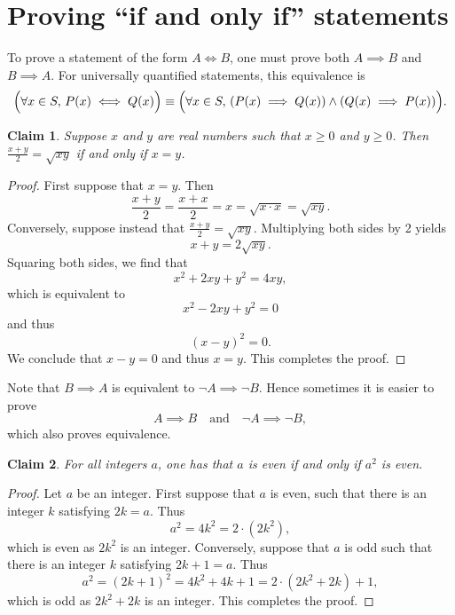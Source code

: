 \documentclass[11pt]{article}
\theoremstyle{plain}
\newtheorem*{claim}{Claim}
\theoremstyle{plain}
\theoremstyle{remark}
\begin{document}
\section*{Proving ``if and only if'' statements}

To prove a statement of the form $A\iff B$, one must prove both $A\implies B$ and $B\implies A$. For universally quantified statements, this equivalence is 
\[
 \Bigl(\forall x\in S,\, P(x)\iff Q(x)\Bigr)\equiv \Bigl(\forall x\in S,\, (P(x)\implies Q(x)) \wedge (Q(x)\implies P(x))\Bigr).
\]


\begin{tcolorbox}
\begin{claim}
 Suppose $x$ and $y$ are real numbers such that $x\geq0$ and $y\geq 0$. Then $\frac{x+y}{2} = \sqrt{xy}$ if and only if $x=y$.
\end{claim}
\end{tcolorbox}
\begin{proof}
 First suppose that $x=y$. Then 
 \[
  \frac{x+y}{2} = \frac{x+x}{2} = x = \sqrt{x\cdot x} = \sqrt{xy}.
 \]
Conversely, suppose instead that $\frac{x+y}{2} = \sqrt{xy}$. Multiplying both sides by 2 yields 
\[
 x+y = 2\sqrt{xy}.
\]
Squaring both sides, we find that 
\[
 x^2+ 2xy + y^2 = 4xy,
\]
which is equivalent to 
\[
 x^2-2xy+y^2 =0
\]
and thus 
\[
 (x-y)^2 = 0.
\]
We conclude that $x-y=0$ and thus $x=y$. This completes the proof.
\end{proof}

Note that $B\implies A$ is equivalent to $\neg A\implies \neg B$. Hence sometimes it is easier to prove 
\[
 A\implies B \quad \text{and}\quad \neg A\implies \neg B,
\]
which also proves equivalence.

\begin{tcolorbox}
\begin{claim}
 For all integers $a$, one has that $a$ is even if and only if $a^2$ is even.
\end{claim}
\end{tcolorbox}
\begin{proof}
 Let $a$ be an integer. First suppose that $a$ is even, such that there is an integer $k$ satisfying $2k=a$. Thus 
 \[
  a^2 = 4k^2 = 2\cdot(2k^2),
 \]
which is even as $2k^2$ is an integer. Conversely, suppose that $a$ is odd such that there is an integer $k$ satisfying $2k+1=a$. Thus
\[
  a^2 = (2k+1)^2 = 4k^2 + 4k + 1 = 2\cdot(2k^2 + 2k) + 1,
 \]
 which is odd as $2k^2 + 2k$ is an integer. This completes the proof.
\end{proof}
\end{document}
